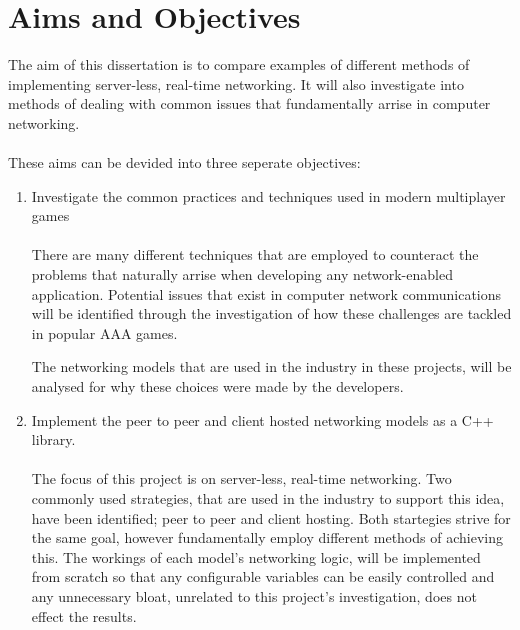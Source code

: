 \section{Aims and Objectives}
The aim of this dissertation is to compare examples of different methods of implementing server-less, real-time networking. It will also investigate into methods of dealing with common issues that fundamentally arrise in computer networking.
\\\\
These aims can be devided into three seperate objectives:
\begin{enumerate}
\item Investigate the common practices and techniques used in modern multiplayer games
  \\\\
  There are many different techniques that are employed to counteract the problems that naturally arrise when developing any network-enabled application. Potential issues that exist in computer network communications will be identified through the investigation of how these challenges are tackled in popular AAA games.

  The networking models that are used in the industry in these projects, will be analysed for why these choices were made by the developers.


\item Implement the peer to peer and client hosted networking models as a C++ library.
  \\\\
  The focus of this project is on server-less, real-time networking. Two commonly used strategies, that are used in the industry to support this idea, have been identified; peer to peer and client hosting. Both startegies strive for the same goal, however fundamentally employ different methods of achieving this.
  The workings of each model's networking logic, will be implemented from scratch so that any configurable variables can be easily controlled and any unnecessary bloat, unrelated to this project's investigation, does not effect the results.


\end{enumerate}
